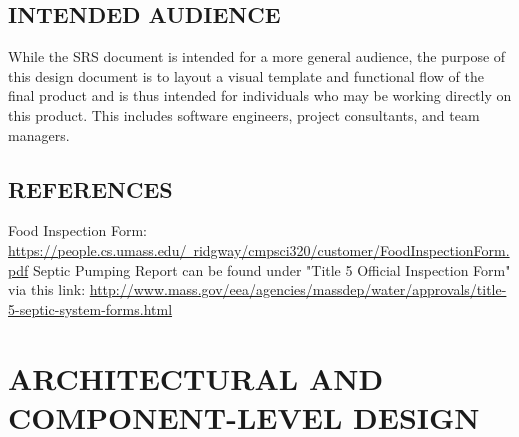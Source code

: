 \documentclass[twoside,letterpaper]{article}
\begin{document}
\subsection[INTENDED AUDIENCE]{\rmfamily\bfseries\color{black}
INTENDED AUDIENCE}
{\rmfamily\color{black}
While the SRS document is intended for a more general audience, the purpose of this design document is to layout a visual template and functional flow of the final product and is thus intended for individuals who may be working directly on this product. This includes software engineers, project consultants, and team managers. 
}

\subsection[REFERENCES]{\rmfamily\bfseries\color{black}
REFERENCES}
{\rmfamily\color{black}
Food Inspection Form: 
\hyperref[]{https://people.cs.umass.edu/~ridgway/cmpsci320/customer/FoodInspectionForm.pdf}
\newline
Septic Pumping Report can be found under "Title 5 Official Inspection Form" via this link: 
\hyperref[]{http://www.mass.gov/eea/agencies/massdep/water/approvals/title-5-septic-system-forms.html}
}

\clearpage\section[ARCHITECTURAL AND COMPONENT-LEVEL DESIGN]{\rmfamily\bfseries\color{black}
ARCHITECTURAL AND COMPONENT-LEVEL DESIGN}
\end{document}

